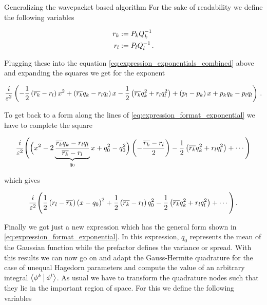 \begin{chapter}{Generalizing the wavepacket based algorithm}
For the sake of readability we define the following variables

\begin{equation}
\begin{split}
  r_k & := P_k Q_k^{-1} \\
  r_l & := P_l Q_l^{-1} \,.
\end{split}
\end{equation}

Plugging these into the equation \eqref{eq:expression_exponentials_combined} above
and expanding the squares we get for the exponent

\begin{equation}
  \frac{i}{\varepsilon^2} \left( - \frac{1}{2}\left(\overline{r_k}-r_l\right) x^2
                                 + \left(\overline{r_k}q_k-r_l q_l\right) x
                                 - \frac{1}{2}\left(\overline{r_k}q_k^2 + r_l q_l^2\right)
                                 + \left(p_l-p_k\right) x
                                 + p_k q_k - p_l q_l
                          \right) \,.
\end{equation}

To get back to a form along the lines of \eqref{eq:expression_format_exponential} we
have to complete the square

\begin{equation}
  \frac{i}{\varepsilon^2} \Biggl( \Bigl(x^2 - 2 \underbrace{\frac{\overline{r_k}q_k-r_l q_l}{\overline{r_k}-r_l}}_{q_0} x + q_0^2 - q_0^2\Bigr)
                                 \left(-\frac{\overline{r_k}-r_l}{2}\right)
                                 - \frac{1}{2}\left(\overline{r_k}q_k^2 + r_l q_l^2\right)
                                 + \cdots
                          \Biggr)
\end{equation}

which gives

\begin{equation}
  \frac{i}{\varepsilon^2} \Biggl( \frac{1}{2}\left(r_l-\overline{r_k}\right) \left(x-q_0\right)^2
                                 + \frac{1}{2}\left(\overline{r_k}-r_l\right) q_0^2
                                 - \frac{1}{2}\left(\overline{r_k}q_k^2 + r_l q_l^2\right)
                                 + \cdots
                          \Biggr) \,.
\end{equation}

Finally we got just a new expression which has the general form shown in \eqref{eq:expression_format_exponential}.
In this expression, $q_0$ represents the mean of the Gaussian function while the
prefactor defines the variance or spread. With this results we can now go on and
adapt the Gauss-Hermite quadrature for the case of unequal Hagedorn parameters
and compute the value of an arbitrary integral $\Braket{ \phi^k | \phi^l }$. As
usual we have to transform the quadrature nodes such that they lie in the important
region of space. For this we define the following variables


\end{chapter}
